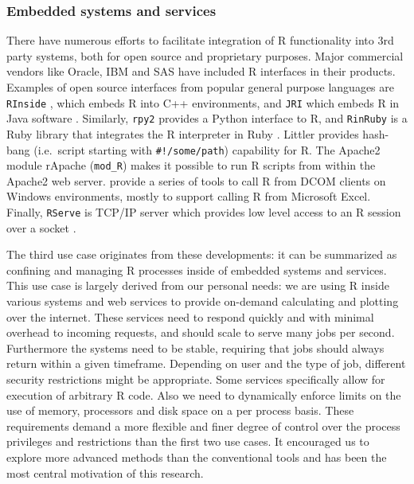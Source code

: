 \documentclass{jss}
\newcommand{\R}{\textsf{R}\xspace}
\newcommand{\Java}{\textsf{Java}\xspace}
\newcommand{\Cpp}{\textsf{C++}\xspace}
\newcommand{\Python}{\textsf{Python}\xspace}
\newcommand{\Ruby}{\textsf{Ruby}\xspace}
\begin{document}
\subsubsection{Embedded systems and services}

There have numerous efforts to facilitate integration of \R functionality into
3rd party systems, both for open source and proprietary purposes. Major
commercial vendors like Oracle, IBM and SAS have included \R interfaces in their
products. Examples of open source interfaces from popular general purpose
languages are \texttt{RInside} \citep{RInside}, which embeds \R into \Cpp
environments, and \texttt{JRI} which embeds \R in \Java software
\citep{JRI,urbanek2007rjava}. Similarly, \texttt{rpy2}
\citep{moreira2006rpy,gautier2008rpy2} provides a \Python interface to \R, and
\texttt{RinRuby} is a \Ruby library that integrates the \R interpreter in Ruby
\citep{dahl2008rinruby}. Littler provides hash-bang (i.e.\ script starting with
\texttt{\#!/some/path}) capability for \R \citep{littler}. The Apache2 module
rApache (\texttt{mod\_R}) \citep{rapache} makes it possible to run \R scripts
from within the Apache2 web server. \cite{heiberger2009r} provide a series of
tools to call \R from DCOM clients on Windows environments, mostly to support
calling \R from Microsoft Excel. Finally, \texttt{RServe} is TCP/IP server which
provides low level access to an \R session over a socket \citep{Rserve}.

The third use case originates from these developments: it can be summarized as
confining and managing \R processes inside of embedded systems and services.
This use case is largely derived from our personal needs: we are using \R inside
various systems and web services to provide on-demand calculating and plotting
over the internet. These services need to respond quickly and with minimal
overhead to incoming requests, and should scale to serve many jobs per second.
Furthermore the systems need to be stable, requiring that jobs should always
return within a given timeframe. Depending on user and the type of job,
different security restrictions might be appropriate. Some services specifically
allow for execution of arbitrary \R code. Also we need to dynamically enforce
limits on the use of memory, processors and disk space on a per process basis.
These requirements demand a more flexible and finer degree of control over the
process privileges and restrictions than the first two use cases. It encouraged
us to explore more advanced methods than the conventional tools and has been
the most central motivation of this research.
\end{document}
